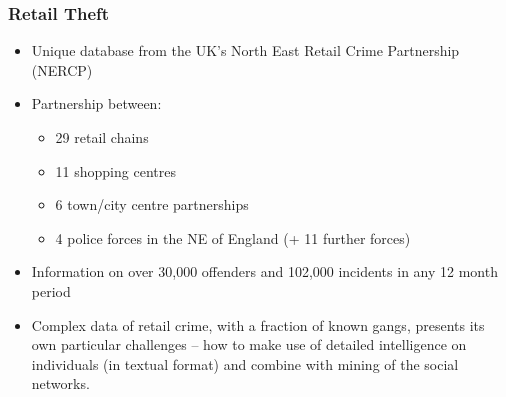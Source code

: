 \documentclass[pdftex]{beamer}
\begin{document}
\begin{frame}
\frametitle{Retail Theft}
\begin{itemize}
\item Unique database from the UK's North East Retail Crime Partnership (NERCP)
\item Partnership between:
\begin{itemize}
\item 29 retail chains
\item 11 shopping centres
\item 6 town/city centre partnerships
\item 4 police forces in the NE of England (+ 11 further forces)
\end{itemize}
\item Information on over 30,000 offenders and 102,000 incidents in
  any 12 month period
\item Complex data of retail crime, with a fraction of known
  gangs, presents its own particular challenges -- how to make use of
  detailed intelligence on individuals (in textual format) and
  combine with mining of the social networks.
\end{itemize}
\end{frame}


\end{document}
